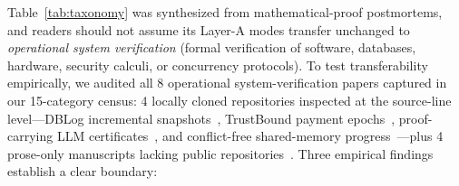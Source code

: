 \documentclass[11pt,letterpaper]{article}
\begin{document}
Table~\ref{tab:taxonomy} was synthesized from mathematical-proof postmortems, and readers should not assume its Layer-A modes transfer unchanged to \emph{operational system verification} (formal verification of software, databases, hardware, security calculi, or concurrency protocols). To test transferability empirically, we audited all 8 operational system-verification papers captured in our 15-category census: 4 locally cloned repositories inspected at the source-line level---DBLog incremental snapshots~\cite{arxiv2611_10810}, TrustBound payment epochs~\cite{arxiv2611_19551}, proof-carrying LLM certificates~\cite{arxiv2605_16407}, and conflict-free shared-memory progress~\cite{arxiv2605_19531}---plus 4 prose-only manuscripts lacking public repositories~\cite{arxiv2611_20298,arxiv2611_25599,arxiv2511_15517,arxiv2605_01140}. Three empirical findings establish a clear boundary:
\end{document}
